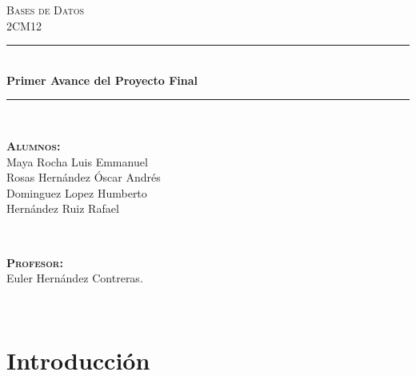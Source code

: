 \documentclass[11pt, fleqn]{article}                             %
\author{Oscar Andrés Rosas}                                     %
\begin{document}
\begin{titlepage}

    \center
    \textsc{\Large Bases de Datos}\\[0.5cm] 
    \textsc{\large 2CM12}\\[1.5cm]

    \rule{\linewidth}{0.5mm} \\[1.0cm]
        { \huge \bfseries Primer Avance del Proyecto Final}\\[1.0cm] 
    \rule{\linewidth}{0.5mm} \\[2.0cm]
     
    \begin{minipage}{0.4\textwidth}
        \begin{flushleft} \large
            \textbf{\textsc{Alumnos:}}\\
            \small{
                Maya Rocha Luis Emmanuel        \\
                Rosas Hernández Óscar Andrés    \\
                Dominguez Lopez Humberto        \\
                Hernández Ruiz Rafael
            }
        \end{flushleft}
    \end{minipage}
    ~
    \begin{minipage}{0.4\textwidth}
        \begin{flushright} \large
            \textbf{\textsc{Profesor: }}\\
            Euler Hernández Contreras.
        \end{flushright}
    \end{minipage}\\[3,5cm]


    \vfill

\end{titlepage}






\section{Introducción}
\end{document}
